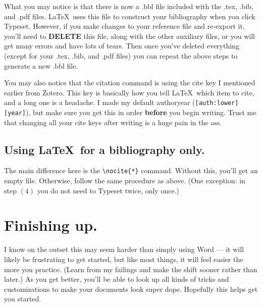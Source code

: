 \documentclass[11pt]{article}
\begin{document}
What you may notice is that there is now a .bbl file included with the .tex, .bib, and .pdf files. \LaTeX\ uses this file to construct your bibliography when you click Typeset. However, if you make changes to your reference file and re-export it, you'll need to \textbf{DELETE} this file, along with the other auxiliary files, or you will get many errors and have lots of tears. Then once you've deleted everything (except for your .tex, .bib, and .pdf files) you can repeat the above steps to generate a new .bbl file.

You may also notice that the citation command is using the cite key I mentioned earlier from Zotero. This key is basically how you tell \LaTeX\ which item to cite, and a long one is a headache. I made my default authoryear (\verb|[auth:lower][year]|), but make sure you get this in order \textbf{before} you begin writing. Trust me that changing all your cite keys after writing is a huge pain in the ass.

\subsection{Using \LaTeX\ for a bibliography only.}

The main difference here is the \verb|\nocite{*}| command. Without this, you'll get an empty file. Otherwise, follow the same procedure as above. (One exception: in step $(4)$ you do not need to Typeset twice, only once.)

\section{Finishing up.}

I know on the outset this may seem harder than simply using Word --- it will likely be frustrating to get started, but like most things, it will feel easier the more you practice. (Learn from my failings and make the shift sooner rather than later.) As you get better, you'll be able to look up all kinds of tricks and customizations to make your documents look super dope. Hopefully this helps get you started.
\end{document}
